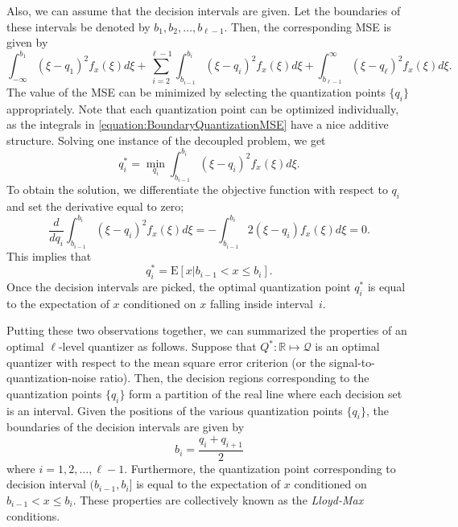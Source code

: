 Also, we can assume that the decision intervals are given.
Let the boundaries of these intervals be denoted by $b_1, b_2, \ldots, b_{\ell-1}$.
Then, the corresponding MSE is given by
\begin{equation} \label{equation:BoundaryQuantizationMSE}
\int_{-\infty}^{b_1} (\xi - q_1)^2 f_x(\xi) d\xi
+ \sum_{i=2}^{{\ell}-1}
\int_{b_{i-1}}^{b_i} (\xi - q_i)^2 f_x(\xi) d\xi
+ \int_{b_{\ell-1}}^{\infty} (\xi - q_{\ell})^2 f_x(\xi) d\xi .
\end{equation}
The value of the MSE can be minimized by selecting the quantization points $\{ q_i \}$ appropriately.
Note that each quantization point can be optimized individually, as the integrals in \eqref{equation:BoundaryQuantizationMSE} have a nice additive structure.
Solving one instance of the decoupled problem, we get
\begin{equation*}
q_i^* = \min_{q_i} \int_{b_{i-1}}^{b_i} (\xi - q_i)^2 f_x(\xi) d\xi .
\end{equation*}
To obtain the solution, we differentiate the objective function with respect to $q_i$ and set the derivative equal to zero;
\begin{equation*}
\frac{d}{d q_i} \int_{b_{i-1}}^{b_i} (\xi - q_i)^2 f_x(\xi) d\xi
= - \int_{b_{i-1}}^{b_i} 2 (\xi - q_i) f_x(\xi) d\xi = 0 .
\end{equation*}
This implies that
\begin{equation*}
q_i^* = \mathrm{E} [ x | b_{i-1} < x \leq b_i ] .
\end{equation*}
Once the decision intervals are picked, the optimal quantization point $q_i^*$ is equal to the expectation of $x$ conditioned on $x$ falling inside interval~$i$.

Putting these two observations together, we can summarized the properties of an optimal $\ell$-level quantizer as follows.
Suppose that $Q^* : \mathbb{R} \mapsto \mathcal{Q}$ is an optimal quantizer with respect to the mean square error criterion (or the signal-to-quantization-noise ratio).
Then, the decision regions corresponding to the quantization points $\{ q_i \}$ form a partition of the real line where each decision set is an interval.
Given the positions of the various quantization points $\{ q_i \}$, the boundaries of the decision intervals are given by
\begin{equation*}
b_i = \frac{q_i + q_{i+1}}{2}
\end{equation*}
where $i = 1, 2, \ldots, \ell-1$.
Furthermore, the quantization point corresponding to decision interval $(b_{i-1}, b_i]$ is equal to the expectation of $x$ conditioned on $b_{i-1} < x \leq b_i$.
These properties are collectively known as the \emph{Lloyd-Max} conditions.


